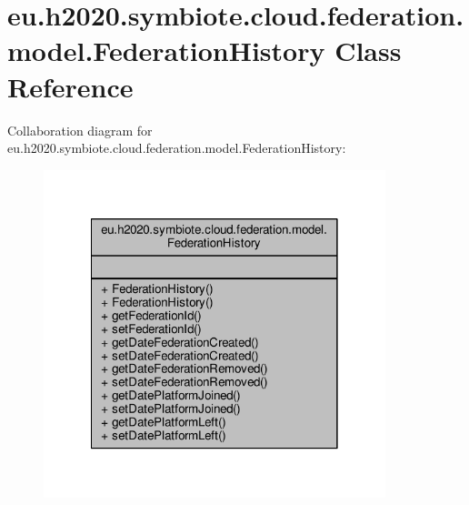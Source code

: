 \hypertarget{classeu_1_1h2020_1_1symbiote_1_1cloud_1_1federation_1_1model_1_1FederationHistory}{}\section{eu.\+h2020.\+symbiote.\+cloud.\+federation.\+model.\+Federation\+History Class Reference}
\label{classeu_1_1h2020_1_1symbiote_1_1cloud_1_1federation_1_1model_1_1FederationHistory}


Collaboration diagram for eu.\+h2020.\+symbiote.\+cloud.\+federation.\+model.\+Federation\+History\+:
\nopagebreak
\begin{figure}[H]
\begin{center}
\leavevmode
\includegraphics[width=282pt]{classeu_1_1h2020_1_1symbiote_1_1cloud_1_1federation_1_1model_1_1FederationHistory__coll__graph}
\end{center}
\end{figure}
